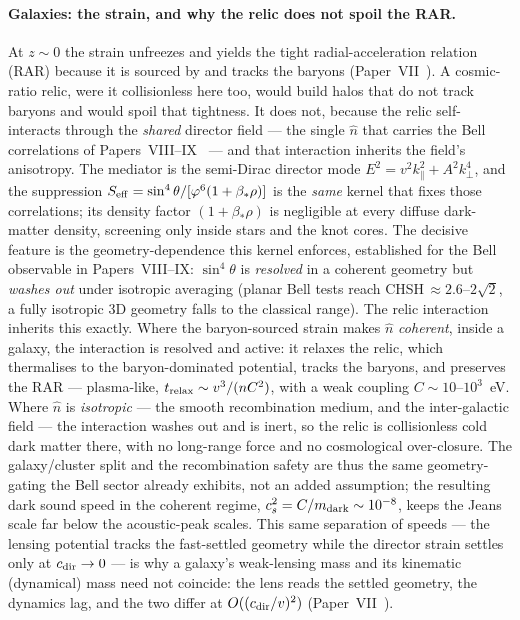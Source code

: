 \documentclass[11pt,a4paper]{article}
\theoremstyle{definition}\newtheorem{definition}[theorem]{Definition}
\newcommand{\vp}{\varphi}
\begin{document}
\paragraph{Galaxies: the strain, and why the relic does not spoil the RAR.}
At $z\sim0$ the strain unfreezes and yields the tight radial-acceleration relation (RAR)
because it is sourced by and tracks the baryons (Paper~VII~\cite{Paper7}). A cosmic-ratio
relic, were it collisionless here too, would build halos that do not track baryons and
would spoil that tightness. It does not, because the relic self-interacts through the
\emph{shared} director field --- the single $\hat n$ that carries the Bell correlations of
Papers~VIII--IX~\cite{Paper8,Paper9} --- and that interaction inherits the field's
anisotropy. The mediator is the semi-Dirac director mode $E^2=v^2k_\parallel^2+A^2k_\perp^4$,
and the suppression $S_{\rm eff}=\sin^4\theta/[\vp^6(1+\beta_*\rho)]$ is the \emph{same}
kernel that fixes those correlations; its density factor $(1+\beta_*\rho)$ is negligible at
every diffuse dark-matter density, screening only inside stars and the knot cores. The
decisive feature is the geometry-dependence this kernel enforces, established for the Bell
observable in Papers~VIII--IX: $\sin^4\theta$ is \emph{resolved} in a coherent geometry but
\emph{washes out} under isotropic averaging (planar Bell tests reach
CHSH$\,\approx2.6$--$2\sqrt2$, a fully isotropic $3$D geometry falls to the classical range).
The relic interaction inherits this exactly. Where the baryon-sourced strain makes $\hat n$
\emph{coherent}, inside a galaxy, the interaction is resolved and active: it relaxes the
relic, which thermalises to the baryon-dominated potential, tracks the baryons, and
preserves the RAR --- plasma-like, $t_{\rm relax}\sim v^3/(nC^2)$, with a weak coupling
$C\sim10$--$10^3$~eV. Where $\hat n$ is \emph{isotropic} --- the smooth recombination
medium, and the inter-galactic field --- the interaction washes out and is inert, so the
relic is collisionless cold dark matter there, with no long-range force and no cosmological
over-closure. The galaxy/cluster split and the recombination safety are thus the same
geometry-gating the Bell sector already exhibits, not an added assumption; the resulting
dark sound speed in the coherent regime, $c_s^2=C/m_{\rm dark}\sim10^{-8}$, keeps the Jeans
scale far below the acoustic-peak scales. This same separation of speeds --- the lensing
potential tracks the fast-settled geometry while the director strain settles only at
$c_{\rm dir}\to0$ --- is why a galaxy's weak-lensing mass and its kinematic (dynamical) mass
need not coincide: the lens reads the settled geometry, the dynamics lag, and the two differ
at $O((c_{\rm dir}/v)^2)$ (Paper~VII~\cite{Paper7}).
\end{document}
